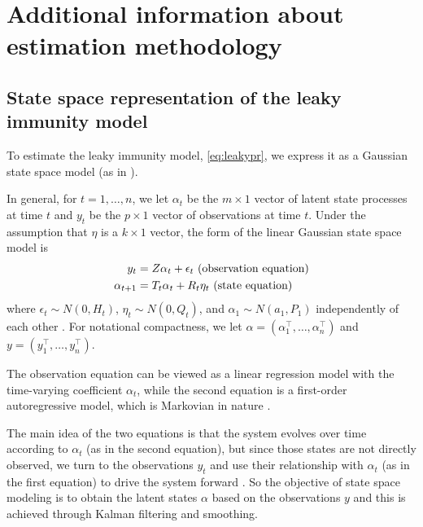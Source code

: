 \documentclass{article}
\begin{document}
\section{Additional information about estimation methodology}

\subsection{State space representation of the leaky immunity model}

To estimate the leaky immunity model, \autoref{eq:leakypr}, we express it as a 
Gaussian state space model (as in \citealp{durbin2012time, helske2017kfas}).

In general, for $t = 1, \dots, n$, we let $\alpha_t$ be the $m \times 1$ vector of latent
state processes at time $t$ and $y_t$ be the $p \times 1$ vector of observations
at time $t$. Under the assumption that $\eta$ is a $k \times 1$ vector, the
form of the linear Gaussian state space model is 
\begin{align}
y_t &= Z\alpha_t + \epsilon_t  \text{     (observation equation)} \label{eq:ss1}\\
\alpha_{t+1} &= T_t\alpha_t + R_t\eta_t  \text{     (state equation) \label{eq:ss2}}
\end{align}
where $\epsilon_t \sim N(0, H_t)$, $\eta_t \sim N(0, Q_t)$, and $\alpha_1 \sim
N(a_1, P_1)$ independently of each other \citep{helske2017kfas}. For notational
compactness, we let $\alpha = \left ( \alpha_1^\top, \dots, \alpha_n^\top \right )$
and $y = \left ( y_1^\top, \dots, y_n^\top \right )$.

The observation equation can be viewed as a linear regression model with the
time-varying coefficient $\alpha_t$, while the second equation is a first-order
autoregressive model, which is Markovian in nature \citep{durbin2012time}. 

The main idea of the two equations is that the system evolves over time
according to $\alpha_t$ (as in the second equation), but since those states are
not directly observed, we turn to the observations $y_t$ and use their
relationship with $\alpha_t$ (as in the first equation) to drive the system
forward \citep{durbin2012time}. So the objective of state space modeling is to
obtain the latent states $\alpha$ based on the observations $y$ and this is
achieved through Kalman filtering and smoothing. 
\end{document}
